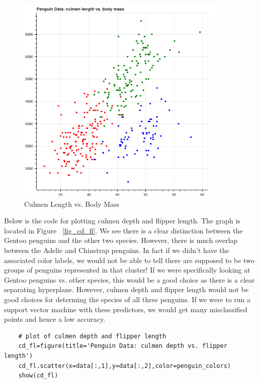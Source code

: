\documentclass[12pt]{article}
\begin{document}
\begin{figure}[H]
    \centering
    \includegraphics[width=4in]{Figures/penguins/cl_bm.png}
    \caption{Culmen Length vs. Body Mass}
    \label{fig_cl_bm}
\end{figure}

Below is the code for plotting culmen depth and flipper length. The graph is located in Figure ~\ref{fig_cd_fl}. We see there is a clear distinction between the Gentoo penguins and the other two species. However, there is much overlap between the Adelie and Chinstrap penguins. In fact if we didn't have the associated color labels, we would not be able to tell there are supposed to be two groups of penguins represented in that cluster! If we were specifically looking at Gentoo penguins vs. other species, this would be a good choice as there is a clear separating hyperplane. However, culmen depth and flipper length would not be good choices for determing the species of all three penguins. If we were to run a support vector machine with these predictors, we would get many misclassified points and hence a low accuracy.

\begin{verbatim}
    # plot of culmen depth and flipper length
    cd_fl=figure(title='Penguin Data: culmen depth vs. flipper length')
    cd_fl.scatter(x=data[:,1],y=data[:,2],color=penguin_colors)
    show(cd_fl)
\end{verbatim}
\end{document}
